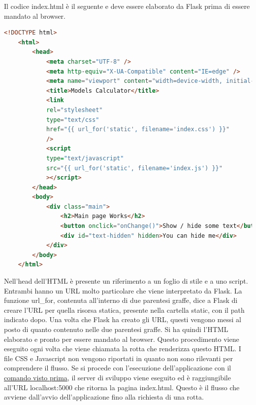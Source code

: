 \hypertarget{lst:flask-creazione-basi-template}
{Il codice index.html è il seguente e deve essere elaborato da Flask prima di essere mandato al browser.}
\begin{lstlisting}[language=html]
	<!DOCTYPE html>
	<html>
		<head>
			<meta charset="UTF-8" />
			<meta http-equiv="X-UA-Compatible" content="IE=edge" />
			<meta name="viewport" content="width=device-width, initial-scale=1.0" />
			<title>Models Calculator</title>
			<link
			rel="stylesheet"
			type="text/css"
			href="{{ url_for('static', filename='index.css') }}"
			/>
			<script
			type="text/javascript"
			src="{{ url_for('static', filename='index.js') }}"
			></script>
		</head>
		<body>
			<div class="main">
				<h2>Main page Works</h2>
				<button onclick="onChange()">Show / hide some text</button>
				<div id="text-hidden" hidden>You can hide me</div>
			</div>
		</body>
	</html>
\end{lstlisting}
Nell'head dell'HTML è presente un riferimento a un foglio di stile e a uno script.
Entrambi hanno un URL molto particolare che viene interpretato da Flask.
La funzione url\_for, contenuta all'interno di due parentesi graffe, 
dice a Flask di creare l'URL per quella risorsa statica, presente nella cartella static, con il path indicato dopo.
Una volta che Flask ha creato gli URL, questi vengono messi al posto di quanto contenuto nelle due parentesi graffe.
Si ha quindi l'HTML elaborato e pronto per essere mandato al browser.
Questo procedimento viene eseguito ogni volta che viene chiamata la rotta che renderizza questo HTML.
I file CSS e Javascript non vengono riportati in quanto non sono rilevanti per comprendere il flusso.\newline
\newline
Se si procede con l'esecuzione dell'applicazione con il \hyperlink{lst:flask-creazione-basi-run}{comando visto prima},
il server di sviluppo viene eseguito ed è raggiungibile all'URL localhost:5000 che ritorna la pagina index.html.
Questo è il flusso che avviene dall'avvio dell'applicazione fino alla richiesta di una rotta.

